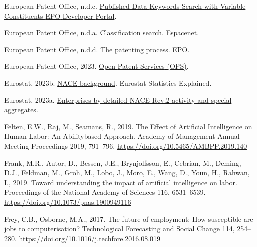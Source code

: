 \documentclass[
  12pt,
  a4paperpaper,
]{article}
\newlength{\cslhangindent}
\newenvironment{CSLReferences}[2] %
 {\begin{list}{}{%
  \setlength{\itemindent}{0pt}
  \setlength{\leftmargin}{0pt}
  \setlength{\parsep}{0pt}
  \ifodd #1
   \setlength{\leftmargin}{\cslhangindent}
   \setlength{\itemindent}{-1\cslhangindent}
  \fi
  \setlength{\itemsep}{#2\baselineskip}}}
 {\end{list}}
\begin{document}
\begin{CSLReferences}{1}{0}
European Patent Office, n.d.c.
\href{https://developers.epo.org/ops-v3-2/apis/get/published-data/search/\%7Bconstituent\%7D}{Published
{Data} {Keywords} {Search} with {Variable} {Constituents} {\textbar}
{EPO} {Developer} {Portal}}.

European Patent Office, n.d.a.
\href{https://worldwide.espacenet.com/patent/cpc-browser}{Classification
search}. Espacenet.

European Patent Office, n.d.d.
\href{https://www.epo.org/en/learning/learning-resources-profile/business-and-ip-managers/inventors-handbook/protecting-your-idea/patenting-process}{The
patenting process}. EPO.

European Patent Office, 2023.
\href{https://developers.epo.org/ops-v3-2/apis}{Open {Patent} {Services}
({OPS})}.

Eurostat, 2023b.
\href{https://ec.europa.eu/eurostat/statistics-explained/index.php?title=NACE_background}{{NACE}
background}. Eurostat Statistics Explained.

Eurostat, 2023a.
\href{https://ec.europa.eu/eurostat/databrowser/view/sbs_ovw_act/default/table?lang=en}{Enterprises
by detailed {NACE} {Rev}.2 activity and special aggregates}.

Felten, E.W., Raj, M., Seamans, R., 2019. The {Effect} of {Artificial}
{Intelligence} on {Human} {Labor}: {An} {Abilitybased} {Approach}.
Academy of Management Annual Meeting Proceedings 2019, 791--796.
\url{https://doi.org/10.5465/AMBPP.2019.140}

Frank, M.R., Autor, D., Bessen, J.E., Brynjolfsson, E., Cebrian, M.,
Deming, D.J., Feldman, M., Groh, M., Lobo, J., Moro, E., Wang, D., Youn,
H., Rahwan, I., 2019. Toward understanding the impact of artificial
intelligence on labor. Proceedings of the National Academy of Sciences
116, 6531--6539. \url{https://doi.org/10.1073/pnas.1900949116}

Frey, C.B., Osborne, M.A., 2017. The future of employment: {How}
susceptible are jobs to computerisation? Technological Forecasting and
Social Change 114, 254--280.
\url{https://doi.org/10.1016/j.techfore.2016.08.019}


\end{CSLReferences}
\end{document}
